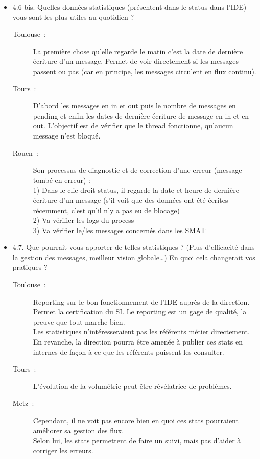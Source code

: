\begin{itemize}
	  \item 4.6 bis. Quelles données statistiques (présentent dans le status dans
	  l’IDE) vous sont les plus utiles au quotidien ?
	  \begin{description}
	  	\item[Toulouse~:] La première chose qu’elle regarde le matin c’est la date
	  	de dernière écriture d’un message. Permet de voir directement si les
	  	messages passent ou pas (car en principe, les messages circulent en flux
	  	continu).
	  	\item[Tours~:] D’abord les messages en in et out puis le nombre de messages
	  	en pending et enfin les dates de dernière écriture de message en in et en
	  	out. L’objectif est de vérifier que le thread fonctionne, qu’aucun message
	  	n’est bloqué.
	  	\item[Rouen~:] Son processus de diagnostic et de correction d’une erreur
	  	(message tombé en erreur) :\\
		1)	Dans le clic droit status, il regarde la date et heure de dernière
		écriture d’un message (s’il voit que des données ont été écrites récemment,
		c’est qu’il n’y a pas eu de blocage)\\
		2)	Va vérifier les logs du process \\
		3)	Va vérifier le/les messages concernés dans les SMAT
	  \end{description}
	  
	  \item 4.7. Que pourrait vous apporter de telles statistiques ? (Plus
	  d’efficacité dans la gestion des messages, meilleur vision globale…) En quoi
	  cela changerait vos pratiques ?
	  \begin{description}
	  	\item[Toulouse~:] Reporting sur le bon fonctionnement de l’IDE auprès de la
	  	direction. Permet la certification du SI. Le reporting est un gage de
	  	qualité, la preuve que tout marche bien.\\
		Les statistiques n’intéresseraient pas les référents métier directement. En
		revanche, la direction pourra être amenée à publier ces stats en internes de
		façon à ce que les référents puissent les consulter.
	  	\item[Tours~:] L’évolution de la volumétrie peut être révélatrice de
	  	problèmes.
	  	\item[Metz~:] Cependant, il ne voit pas encore bien en quoi ces stats
	  	pourraient améliorer sa gestion des flux.\\
		Selon lui, les stats permettent de faire un suivi, mais pas d’aider à corriger
		les erreurs.
	  \end{description}
	\end{itemize}